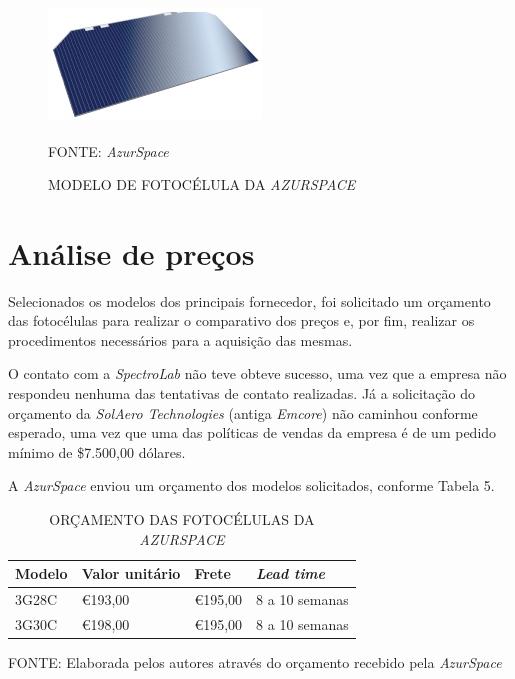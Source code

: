 \documentclass[
	12pt,				%
	openright,			%
	oneside,			%
	a4paper,			%
	english,			%
	french,				%
	spanish,			%
	brazil,				%
	oldfontcommands
	]{abntex2}
\begin{document}
	\begin{figure}[th]
		\caption{MODELO DE FOTOCÉLULA DA \textit{AZURSPACE}}
		\centering
		\includegraphics[width=0.5\linewidth]{./figs/ZTJ}
			
		\begin{small}
			FONTE: \textit{AzurSpace}\textsuperscript{\cite{AzurSpace2}}
		\end{small}		
	\end{figure}	
	\pagebreak
	
\section[Análise de preços]{Análise de preços}

	Selecionados os modelos dos principais fornecedor, foi solicitado um orçamento das fotocélulas para realizar o comparativo dos preços e, por fim, realizar os procedimentos necessários para a aquisição das mesmas.
	
	O contato com a \textit{SpectroLab} não teve obteve sucesso, uma vez que a empresa não respondeu nenhuma das tentativas de contato realizadas. Já a solicitação do orçamento da \textit{SolAero Technologies} (antiga \textit{Emcore}) não caminhou conforme esperado, uma vez que uma das políticas de vendas da empresa é de um pedido mínimo de \$7.500,00 dólares.
	
	A \textit{AzurSpace} enviou um orçamento dos modelos solicitados, conforme Tabela 5.
	
	\begin{table}[th]
	\caption{ORÇAMENTO DAS FOTOCÉLULAS DA \textit{AZURSPACE}}
	\centering
	\begin{tabular}{p{3.0cm}|p{3.0cm}|p{3.0cm}|p{3.0cm}}
		\textbf{Modelo} & \textbf{Valor unitário} & \textbf{Frete} & \textit{\textbf{Lead time}}\\
		\hline
		3G28C & \euro 193,00 & \euro 195,00 & 8 a 10 semanas\\
		3G30C & \euro 198,00 & \euro 195,00 & 8 a 10 semanas\\

	\end{tabular}
	
	\begin{small}
	\vspace{3pt}
		FONTE: Elaborada pelos autores através do orçamento recebido pela \textit{AzurSpace}
	\end{small}
	\end{table}	
	
\end{document}

